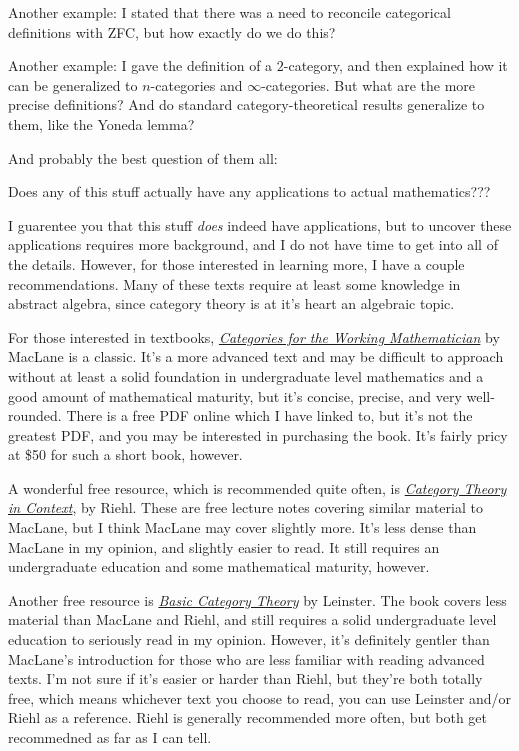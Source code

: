 \documentclass[11pt, letterpaper]{article}
\begin{document}
Another example: I stated that there was a need to reconcile categorical definitions with ZFC, but how exactly do we do this?

Another example: I gave the definition of a $2$-category, and then explained how it can be generalized to $n$-categories and $\infty $-categories. But what are the more precise definitions? And do standard category-theoretical results generalize to them, like the Yoneda lemma?

And probably the best question of them all:
\begin{displayquote}
	Does any of this stuff actually have any applications to actual mathematics???
\end{displayquote}

I guarentee you that this stuff \emph{does} indeed have applications, but to uncover these applications requires more background, and I do not have time to get into all of the details. However, for those interested in learning more, I have a couple recommendations. Many of these texts require at least some knowledge in abstract algebra, since category theory is at it's heart an algebraic topic.

For those interested in textbooks, \href{https://math.mit.edu/~hrm/palestine/maclane-categories.pdf}{\emph{Categories for the Working Mathematician}} by MacLane is a classic. It's a more advanced text and may be difficult to approach without at least a solid foundation in undergraduate level mathematics and a good amount of mathematical maturity, but it's concise, precise, and very well-rounded. There is a free PDF online which I have linked to, but it's not the greatest PDF, and you may be interested in purchasing the book. It's fairly pricy at \$50 for such a short book, however.

A wonderful free resource, which is recommended quite often, is \href{https://math.jhu.edu/~eriehl/context.pdf}{\emph{Category Theory in Context}}, by Riehl. These are free lecture notes covering similar material to MacLane, but I think MacLane may cover slightly more. It's less dense than MacLane in my opinion, and slightly easier to read. It still requires an undergraduate education and some mathematical maturity, however.

Another free resource is \href{https://arxiv.org/pdf/1612.09375}{\emph{Basic Category Theory}} by Leinster. The book covers less material than MacLane and Riehl, and still requires a solid undergraduate level education to seriously read in my opinion. However, it's definitely gentler than MacLane's introduction for those who are less familiar with reading advanced texts. I'm not sure if it's easier or harder than Riehl, but they're both totally free, which means whichever text you choose to read, you can use Leinster and/or Riehl as a reference. Riehl is generally recommended more often, but both get recommedned as far as I can tell.
\end{document}
